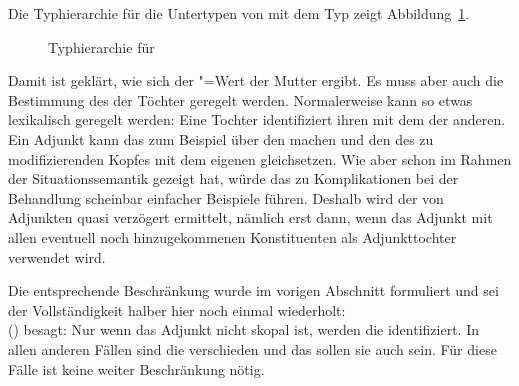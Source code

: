 Die Typhierarchie für die Untertypen von  mit dem Typ
 zeigt Abbildung~\ref{abb-headed-phrase-head-non-adjunct-structure}.

\begin{figure}
\caption{\label{abb-headed-phrase-head-non-adjunct-structure}Typhierarchie für }
\end{figure}


Damit ist geklärt, wie sich der \ltop"=Wert der Mutter ergibt. Es muss aber auch die Bestimmung des
\ltopwes der Töchter geregelt werden. Normalerweise kann so etwas lexikalisch geregelt werden: Eine
Tochter identifiziert ihren \ltopw mit dem der anderen. Ein Adjunkt kann das zum Beispiel über
den \modw machen und den \ltopw des zu modifizierenden Kopfes mit dem eigenen gleichsetzen. Wie
\citet{Kasper97a} aber schon im Rahmen der Situationssemantik gezeigt hat, würde das zu
Komplikationen bei der Behandlung scheinbar einfacher Beispiele führen. Deshalb wird der \ltopw von
Adjunkten quasi verzögert ermittelt, nämlich erst dann, wenn das Adjunkt mit allen eventuell noch
hinzugekommenen Konstituenten als Adjunkttochter verwendet wird.

Die entsprechende Beschränkung wurde im vorigen Abschnitt formuliert und sei der Vollständigkeit
halber hier noch einmal wiederholt:
\ea
\label{ex-scopal-ltop2}\label{Semantikprinzip-nicht-skopaleTochter-LTOP}
 \impl\\[2mm]
\mbox{}\hfill 
{}
\z
() besagt: Nur wenn das Adjunkt nicht skopal ist, werden die \ltopwe identifiziert. In allen anderen Fällen
sind die \ltopwe verschieden und das sollen sie auch sein. Für diese Fälle ist keine weiter
Beschränkung nötig.

